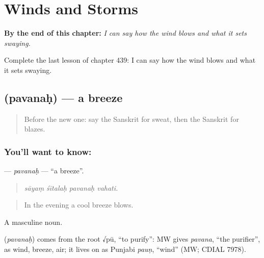 
\chapter{Winds and Storms}
\label{ch:sa-winds-and-storms}

\begin{chapteropening}
\textbf{By the end of this chapter:} \emph{I can say how the wind blows and what it sets swaying.}

Complete the last lesson of chapter 439: I can say how the wind blows and what it sets swaying.
\end{chapteropening}

\section[\texorpdfstring{\sk{पवनः} (pavanaḥ)}{पवनः (pavanaḥ)}]{ (pavanaḥ) — a breeze}

\label{lesson:SA-C439-pavanah}



\begin{quote}
Before the new one: say the Sanskrit for sweat, then the Sanskrit for blazes.
\end{quote}

\subsection*{You'll want to know: }
\textbf{} — \emph{pavanaḥ} — \textquotedblleft{}a breeze\textquotedblright{}.

\begin{quote}
   
\end{quote}

\begin{quote}
\emph{sāyaṃ śītalaḥ pavanaḥ vahati.}
\end{quote}

\begin{quote}
In the evening a cool breeze blows.
\end{quote}

A masculine noun.

\begin{cousinweb}
\textbf{} (\emph{pavanaḥ}) comes from the root √pū, \textquotedblleft{}to purify\textquotedblright{}: MW gives \emph{pavana}, \textquotedblleft{}the purifier\textquotedblright{}, as wind, breeze, air; it lives on as Punjabi \emph{pauṇ}, \textquotedblleft{}wind\textquotedblright{} (MW; CDIAL 7978).
\end{cousinweb}

